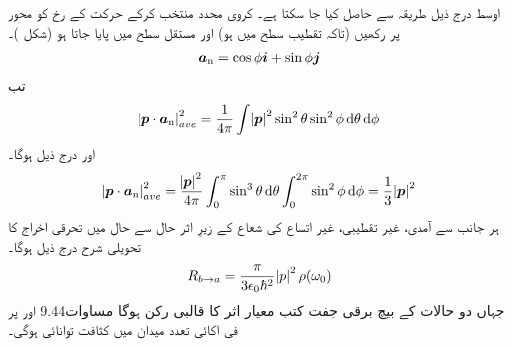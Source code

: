  اوسط درج ذیل طریقہ سے حاصل کیا جا سکتا ہے۔ کروی محدد منتخب کرکے حرکت کے رخ کو  محور پر رکھیں  (تاکہ تقطیب  سطح میں ہو)  اور مستقل   سطح  میں پایا جاتا ہو    (شکل )۔
\begin{align}
	{\ensuremath{{\boldsymbol{a}}}_{\textup{n}}} = \cos\phi{\boldsymbol{i}}+\sin\phi{\boldsymbol{j}}
\end{align}  
تب 
\begin{align*}
	\abs{\kvec{p}\cdot \kvecsub{a}{n}}^2_{ave} = \frac{1}{4\pi}\int\abs{\kvec{p}}^2\sin^2\theta\sin^2\phi \dif \theta \dif \phi
\end{align*}
اور درج ذیل ہوگا۔ 
\begin{align}
	\abs{\kvec{p}\cdot\kvecsub{a}{n}}^2_{ave} = \frac{\abs{\kvec{p}}^2}{4\pi}\int_0^{\pi}\sin^3\theta\dif\theta\int_0^{2\pi}\sin^2\phi\dif\phi = \frac{1}{3}\abs{\kvec{p}}^2
\end{align}
  ہر جانب سے آمدی، غیر تقطیبی، غیر اتساع کی شعاع کے زیرِ اثر حال  سے حال  میں تحرقی اخراج کا تحویلی شرح  درج ذیل ہوگا۔
\begin{align}
	R_{b\rightarrow a} = \frac{\pi}{3\epsilon_0\hbar^2}\abs{p}^2\rho(\omega_0)
\end{align}
جہاں دو حالات کے بیچ برقی جفت کتب معیار اثر کا قالبی رکن  ہوگا مساوات\num{9.44} اور  پر فی اکائی تعدد میدان میں کثافت توانائی  ہوگی۔


